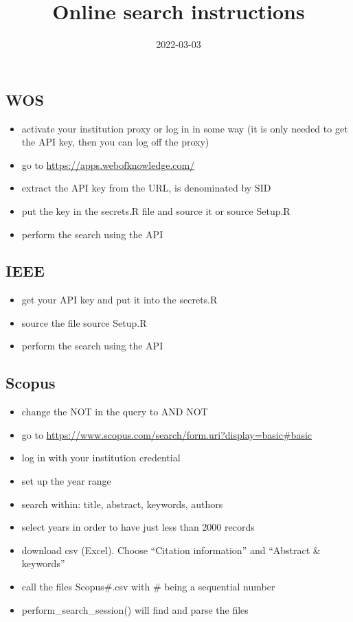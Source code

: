 \documentclass[
]{article}
\title{Online search instructions}
\author{}
\date{\vspace{-2.5em}2022-03-03}
\providecommand{\tightlist}{%
  \setlength{\itemsep}{0pt}\setlength{\parskip}{0pt}}
\begin{document}
\maketitle

\hypertarget{wos}{%
\subsection{WOS}\label{wos}}

\begin{itemize}
\tightlist
\item
  activate your institution proxy or log in in some way (it is only
  needed to get the API key, then you can log off the proxy)
\item
  go to \url{https://apps.webofknowledge.com/}
\item
  extract the API key from the URL, is denominated by SID
\item
  put the key in the secrets.R file and source it or source Setup.R
\item
  perform the search using the API
\end{itemize}

\hypertarget{ieee}{%
\subsection{IEEE}\label{ieee}}

\begin{itemize}
\tightlist
\item
  get your API key and put it into the secrets.R
\item
  source the file source Setup.R
\item
  perform the search using the API
\end{itemize}

\hypertarget{scopus}{%
\subsection{Scopus}\label{scopus}}

\begin{itemize}
\tightlist
\item
  change the NOT in the query to AND NOT
\item
  go to
  \url{https://www.scopus.com/search/form.uri?display=basic\#basic}
\item
  log in with your institution credential
\item
  set up the year range
\item
  search within: title, abstract, keywords, authors
\item
  select years in order to have just less than 2000 records
\item
  download csv (Excel). Choose ``Citation information'' and ``Abstract
  \& keywords''
\item
  call the files Scopus\#.csv with \# being a sequential number
\item
  perform\_search\_session() will find and parse the files
\end{itemize}
\end{document}

